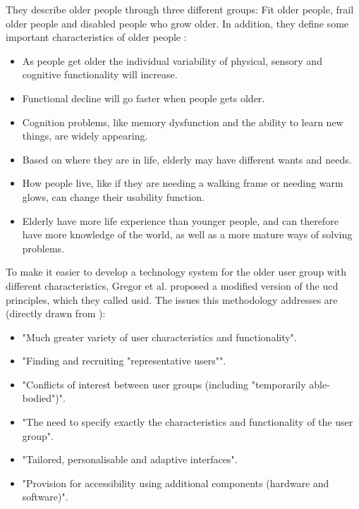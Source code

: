 They describe older people through three different groups: Fit older people, frail older people and disabled people who grow older. In addition, they define some important characteristics of older people \cite{gregor}:
\begin{itemize}
\item As people get older the individual variability of physical, sensory and cognitive functionality will increase. 
\item Functional decline will go faster when people gets older. 
\item Cognition problems, like memory dysfunction and the ability to learn new things, are widely appearing.
\item Based on where they are in life, elderly may have different wants and needs. 
\item How people live, like if they are needing a walking frame or needing warm glows, can change their usability function.
\item Elderly have more life experience than younger people, and can therefore have more knowledge of the world, as well as a more mature ways of solving problems. 
\end{itemize}

To make it easier to develop a technology system for the older user group with different characteristics, Gregor et al. proposed a modified version of the \ac{ucd} principles, which they called \ac{usid}. The issues this methodology addresses are (directly drawn from \cite{gregor}): 
\begin{itemize}
\item "Much greater variety of user characteristics and functionality". 
\item "Finding and recruiting "representative users"". 
\item "Conflicts of interest between user groups (including "temporarily able-bodied")".
\item "The need to specify exactly the characteristics and functionality of the user group".
\item "Tailored, personalisable and adaptive interfaces".
\item "Provision for accessibility using additional components (hardware and software)".
\end{itemize}

